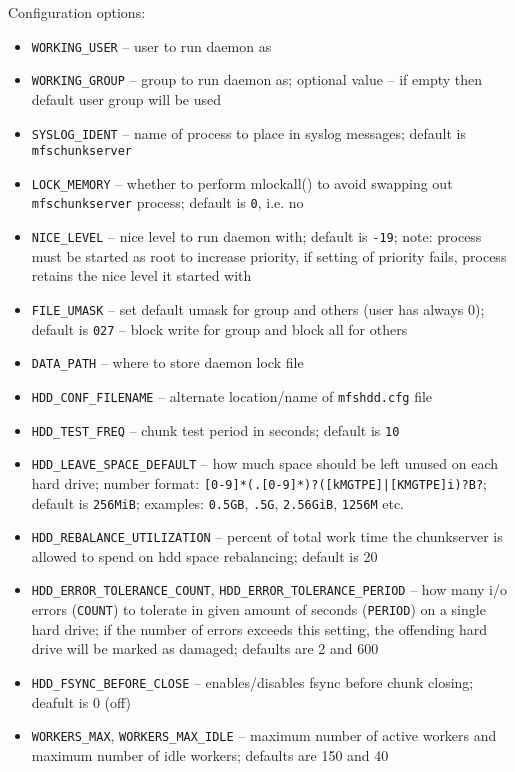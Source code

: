 \documentclass[a4paper,11pt,english]{report}
\def\code#1{\texttt{#1}}
\begin{document}
				Configuration options:
				\begin{itemize}
					\item \code{WORKING\_USER} -- user to run daemon as
					\item \code{WORKING\_GROUP} -- group to run daemon as; optional value -- if empty then default user group will be used
					\item \code{SYSLOG\_IDENT} -- name  of  process  to  place  in  syslog  messages;  default  is \code{mfschunkserver}
					\item \code{LOCK\_MEMORY} -- whether  to   perform   mlockall()   to   avoid   swapping   out \code{mfschunkserver} process; default is \code{0}, i.e. no
					\item \code{NICE\_LEVEL} -- nice  level  to  run  daemon with; default is \code{-19}; note: process must be started as root to increase priority, if setting of priority fails, process retains the nice level it started with
					\item \code{FILE\_UMASK} -- set  default  umask  for  group  and others (user has always 0); default is \code{027} -- block write for group and block all for others
					\item \code{DATA\_PATH} -- where to store daemon lock file
					\item \code{HDD\_CONF\_FILENAME} -- alternate location/name of \code{mfshdd.cfg} file
					\item \code{HDD\_TEST\_FREQ} -- chunk test period in seconds; default is \code{10}
					\item \code{HDD\_LEAVE\_SPACE\_DEFAULT} -- how much space should be left unused on each hard drive;  number format:  \code{[0-9]*(.[0-9]*)?([kMGTPE]|[KMGTPE]i)?B?};  default  is \code{256MiB}; examples: \code{0.5GB}, \code{.5G}, \code{2.56GiB}, \code{1256M} etc.
					\item \code{HDD\_REBALANCE\_UTILIZATION} -- percent of total work time the chunkserver is allowed to spend on hdd space rebalancing; default is 20
					\item \code{HDD\_ERROR\_TOLERANCE\_COUNT}, \code{HDD\_ERROR\_TOLERANCE\_PERIOD} -- how many i/o errors (\code{COUNT}) to tolerate in given amount of seconds (\code{PERIOD}) on a single hard drive; if the number of errors exceeds this setting, the offending hard drive will be marked as damaged; defaults are 2 and 600
					\item \code{HDD\_FSYNC\_BEFORE\_CLOSE} -- enables/disables fsync before chunk closing; deafult is 0 (off)
					\item \code{WORKERS\_MAX}, \code{WORKERS\_MAX\_IDLE} -- maximum number of active workers and maximum number of idle workers; defaults are 150 and 40

\end{itemize}
\end{document}
